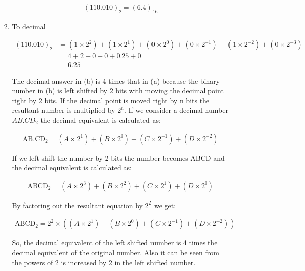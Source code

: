 \documentclass{article}
\begin{document}
\begin{enumerate}[label=\textbf{\arabic*.}]
\begin{enumerate}[label=\textbf{\alph*.}]
\begin{enumerate}[label=\textbf{\roman*.}]
            \begin{align*}
                (110.010)_2 = (6.4)_{16}
            \end{align*}

            \item To decimal \newline
            
            \begin{align*}
                (110.010)_2 &= (1 \times 2^2) + (1 \times 2^1) + (0 \times 2^0) + (0 \times 2^{-1}) + (1 \times 2^{-2}) + (0 \times 2^{-3}) \\
                &= 4 + 2 + 0 + 0 + 0.25 + 0 \\
                &= 6.25
            \end{align*}
        
            The decimal answer in (b) is 4 times  that in (a) because the binary number in (b) is left shifted by 2 bits with moving the decimal point right by 2 bits. If the decimal point is moved right by n bits the resultant number is multiplied by \(2^n\). If we consider a decimal number \(AB.CD_2\) the decimal equivalent is calculated as: \newline

            \begin{align*}
                \text{AB.CD}_2 = (A \times 2^1) + (B \times 2^0) + (C \times 2^{-1}) + (D \times 2^{-2})
            \end{align*}

            If we left shift the number by 2 bits the number becomes \(\text{ABCD}\) and the decimal equivalent is calculated as: \newline

            \begin{align*}
                \text{ABCD}_2 = (A \times 2^3) + (B \times 2^2) + (C \times 2^1) + (D \times 2^0)
            \end{align*}

            By factoring out the resultant equation by \(2^2\) we get: \newline

            \begin{align*}
                \text{ABCD}_2 = 2^2 \times \left((A \times 2^1) + (B \times 2^0) + (C \times 2^{-1}) + (D \times 2^{-2})\right)
            \end{align*}

            So, the decimal equivalent of the left shifted number is 4 times the decimal equivalent of the original number. Also it can be seen from the powers of 2 is increased by 2 in the left shifted number.


\end{enumerate}
\end{enumerate}
\end{enumerate}
\end{document}
